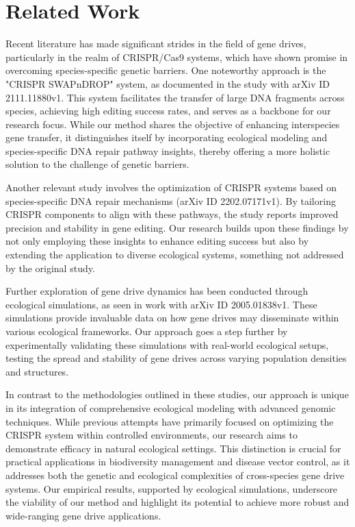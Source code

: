 \documentclass{article}
\begin{document}
\section{Related Work}
Recent literature has made significant strides in the field of gene drives, particularly in the realm of CRISPR/Cas9 systems, which have shown promise in overcoming species-specific genetic barriers. One noteworthy approach is the "CRISPR SWAPnDROP" system, as documented in the study with arXiv ID 2111.11880v1. This system facilitates the transfer of large DNA fragments across species, achieving high editing success rates, and serves as a backbone for our research focus. While our method shares the objective of enhancing interspecies gene transfer, it distinguishes itself by incorporating ecological modeling and species-specific DNA repair pathway insights, thereby offering a more holistic solution to the challenge of genetic barriers.

Another relevant study involves the optimization of CRISPR systems based on species-specific DNA repair mechanisms (arXiv ID 2202.07171v1). By tailoring CRISPR components to align with these pathways, the study reports improved precision and stability in gene editing. Our research builds upon these findings by not only employing these insights to enhance editing success but also by extending the application to diverse ecological systems, something not addressed by the original study.

Further exploration of gene drive dynamics has been conducted through ecological simulations, as seen in work with arXiv ID 2005.01838v1. These simulations provide invaluable data on how gene drives may disseminate within various ecological frameworks. Our approach goes a step further by experimentally validating these simulations with real-world ecological setups, testing the spread and stability of gene drives across varying population densities and structures.

In contrast to the methodologies outlined in these studies, our approach is unique in its integration of comprehensive ecological modeling with advanced genomic techniques. While previous attempts have primarily focused on optimizing the CRISPR system within controlled environments, our research aims to demonstrate efficacy in natural ecological settings. This distinction is crucial for practical applications in biodiversity management and disease vector control, as it addresses both the genetic and ecological complexities of cross-species gene drive systems. Our empirical results, supported by ecological simulations, underscore the viability of our method and highlight its potential to achieve more robust and wide-ranging gene drive applications.
\end{document}
